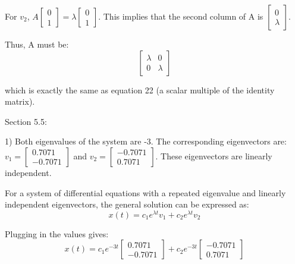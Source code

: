 \documentclass{article}
\begin{document}
For $v_2$,
$A \begin{bmatrix}
    0 \\
    1
\end{bmatrix} = \lambda \begin{bmatrix}
    0 \\
    1
\end{bmatrix}$. This implies that the second column of A
is $\begin{bmatrix}
    0 \\
    \lambda
\end{bmatrix}$.

Thus, A must be:
\[\begin{bmatrix}
    \lambda & 0 \\
    0 & \lambda
\end{bmatrix}\]

which is exactly the same as equation 22 (a scalar multiple of the
identity matrix).


Section 5.5:

1) Both eigenvalues of the system are -3.
The corresponding eigenvectors are:
$v_1 = \begin{bmatrix}
    0.7071 \\
    -0.7071
\end{bmatrix}$ and $v_2 = \begin{bmatrix}
    -0.7071 \\
    0.7071
\end{bmatrix}$. These eigenvectors are linearly
independent.

For a system of differential equations with a repeated eigenvalue
and linearly independent eigenvectors, the general solution
can be expressed as:
\[x(t) = c_1 e^{\lambda t} v_1 + c_2 e^{\lambda t} v_2\]

Plugging in the values gives:
\[x(t) = c_1 e^{-3t} \begin{bmatrix}
    0.7071 \\
    -0.7071
\end{bmatrix} + c_2 e^{-3t} \begin{bmatrix}
    -0.7071 \\
    0.7071
\end{bmatrix}\]
\end{document}
